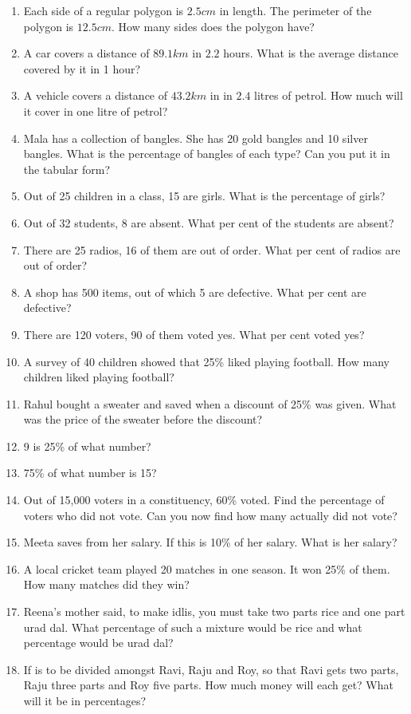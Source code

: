\begin{enumerate}[label=\thesubsection.\arabic*,ref=\thesubsection.\theenumi,resume*]
\item Each side of a regular polygon is $2.5cm$ in length.  The perimeter of the polygon is $12.5cm$.  How many sides does the polygon have?
\item A car covers a distance of $89.1km$ in $2.2$ hours.  What is the average distance covered by it in 1 hour?
\item A vehicle covers a distance of $43.2km$ in in $2.4$ litres of petrol.  How much will it cover in one litre of petrol?
\item 	Mala has a collection of bangles. She has 20 gold bangles and 10 silver bangles. What is the percentage of bangles of each type? Can you put it in the tabular form?
\item 	Out of 25 children in a class, 15 are girls. What is the percentage of girls?
\item Out of 32 students, 8 are absent. What per cent of the students are absent? 
\item There are 25 radios, 16 of them are out of order. What per cent of radios are out of order?
\item  A shop has 500 items, out of which 5 are defective. What per cent are defective? 
\item  There are 120 voters, 90 of them voted yes. What per cent voted yes?
\item 	A survey of 40 children showed that 25\% liked playing football. How many children liked playing football?
\item	Rahul bought a sweater and saved   when a discount of 25\% was given. What was the price of the sweater before the discount?
\item 	9 is 25\% of what number? 
\item 	75\% of what number is 15?
\item Out of 15,000 voters in a constituency, 60\% voted. Find the percentage of voters who did not vote. Can you now find how many actually did not vote?
\item  Meeta saves  from her salary. If this is 10\% of her salary. What is her salary?
\item  A local cricket team played 20
	matches in one season. It won 25\% of them. How many matches did they win?
\item Reena’s mother said, to make idlis, you must take two parts rice and one part urad dal. What percentage of such a mixture would be rice and what percentage would be urad dal?
\item If  is to be divided amongst Ravi, Raju and Roy, so that Ravi gets two parts, Raju three parts and Roy five parts. How much money will each get? What will it be in percentages?

\end{enumerate}
